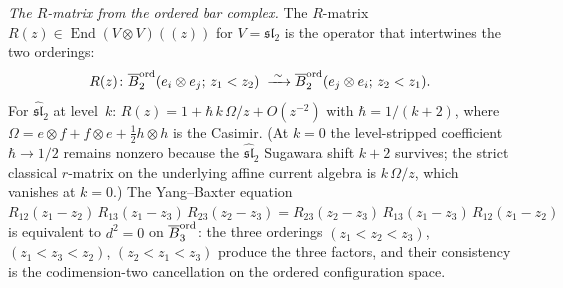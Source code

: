 \begin{computation}
\emph{The $R$-matrix from the ordered bar complex.}
The $R$-matrix $R(z)\in\operatorname{End}(V\otimes V)(\!(z)\!)$
for $V=\mathfrak{sl}_2$ is the operator that intertwines
the two orderings:
\[
R(z)\colon
\overline{B}^{\mathrm{ord}}_2(e_i\otimes e_j;\,z_1<z_2)
\;\xrightarrow{\;\sim\;}
\overline{B}^{\mathrm{ord}}_2(e_j\otimes e_i;\,z_2<z_1).
\]
For $\widehat{\mathfrak{sl}}_2$ at level~$k$:
$R(z)=1+\hbar\,k\,\Omega/z+O(z^{-2})$ with
$\hbar=1/(k+2)$, where
$\Omega=e\otimes f+f\otimes e+\tfrac12 h\otimes h$
is the Casimir. (At $k=0$ the level-stripped
coefficient $\hbar\to 1/2$ remains nonzero because
the $\widehat{\mathfrak{sl}}_2$ Sugawara shift
$k+2$ survives; the strict classical $r$-matrix
on the underlying affine current algebra is
$k\,\Omega/z$, which vanishes at $k=0$.) The Yang--Baxter equation
$R_{12}(z_1{-}z_2)\,R_{13}(z_1{-}z_3)\,
R_{23}(z_2{-}z_3)
=R_{23}(z_2{-}z_3)\,R_{13}(z_1{-}z_3)\,
R_{12}(z_1{-}z_2)$
is equivalent to $d^2=0$ on
$\overline{B}^{\mathrm{ord}}_3$: the three orderings
$(z_1<z_2<z_3)$, $(z_1<z_3<z_2)$, $(z_2<z_1<z_3)$
produce the three factors, and their consistency is
the codimension-two cancellation on the ordered
configuration space.
\end{computation}

